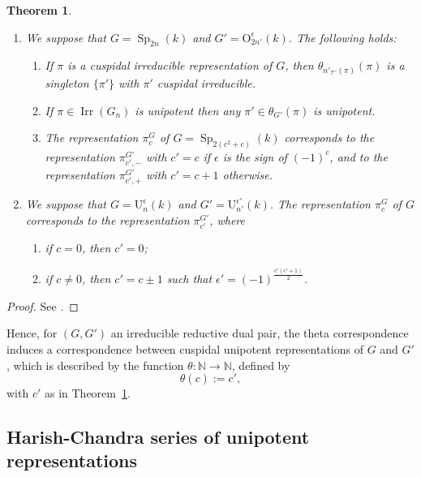\documentclass[12pt]{amsart}
\numberwithin{equation}{subsection}
\newtheorem{thm}[equation]{Theorem}
\newcommand{\NN}{\mathbb{N}}
\newcommand{\cT}{\mathcal{T}}
\newcommand{\rU}{\mathrm{U}}
\newcommand{\Irr}{\operatorname{Irr}}
\newcommand{\Sp}{\operatorname{Sp}}
\def\rO{{\mathrm{O}}}
\def\cT{{\mathcal{T}}}
\begin{document}
\begin{thm} \label{thm:ucuspidals} \

\begin{enumerate}
\item We suppose that  $G=\Sp_{2n}(k)$ and $G'=\rO_{2n'}^\epsilon(k)$. The following holds:
\begin{enumerate}
\item If $\pi$ is a cuspidal irreducible  representation of $G$, then $\theta_{n'_{\cT'}(\pi)}(\pi)$ is a singleton $\{\pi'\}$ with $\pi'$ cuspidal irreducible.
\item If $\pi\in\Irr(G_n)$ is unipotent then any $\pi'\in \theta_{G'}(\pi)$ is unipotent.
\item The representation $\pi_c^G$ of $G=\Sp_{2(c^2+c)}(k)$ corresponds to the representation $\pi^{G'}_{c',-}$ with $c'=c$ if $\epsilon$ is the sign of $(-1)^c$, and to the representation $\pi^{G'}_{c',+}$ with $c'=c+1$ otherwise.
\end{enumerate}
\item We suppose that  $G=\rU_{n}^\epsilon(k)$ and $G'=\rU_{n'}^{\epsilon'}(k)$. The representation $\pi_c^G$ of $G$ corresponds to the representation $\pi^{G'}_{c'}$, where
\begin{enumerate}
\item if $c=0$, then $c'=0$;
\item if $c\ne 0$, then $c'=c\pm 1$ such that $\epsilon'=(-1)^{\frac{c'(c'+1)}{2}}$.
\end{enumerate}
\end{enumerate}
\end{thm}
\begin{proof}
See  \cite{Adams-Moy}.
\end{proof}

Hence, for $(G,G')$ an irreducible reductive dual pair,  the theta  correspondence induces a correspondence between cuspidal unipotent representations of $G$ and $G'$, 
which is described by the function $\theta\colon\NN\to \NN$, defined by 
\begin{equation}
\theta(c):=c',
\end{equation}
with $c'$ as in Theorem~\ref{thm:ucuspidals}.

\subsection{Harish-Chandra series of unipotent representations} \label{subsec:HCunip}\
\end{document}
